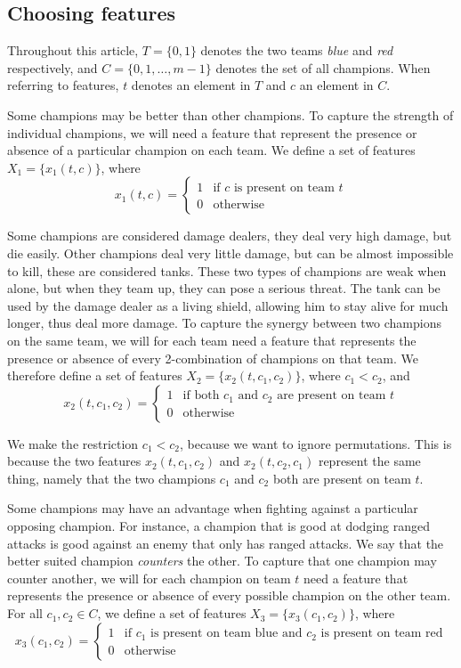 \subsection{Choosing features}\label{sec:choosingfeatures}
Throughout this article, $T = \{0, 1\}$ denotes the two teams \emph{blue} and \emph{red} respectively, and $C = \{0, 1, \dots, m-1\}$ denotes the set of all champions. When referring to features, $t$ denotes an element in $T$ and $c$ an element in $C$.

Some champions may be better than other champions. To capture the strength of individual champions, we will need a feature that represent the presence or absence of a particular champion on each team.
We define a set of features $X_1 = \{x_1(t, c)\}$, where
\[
x_1(t, c) = 
\begin{cases} 
  1 & \text{if } c \text{ is present on team } t \\
  0 & \text{otherwise} 
\end{cases}
\]

Some champions are considered damage dealers, they deal very high damage, but die easily. Other champions deal very little damage, but can be almost impossible to kill, these are considered tanks. These two types of champions are weak when alone, but when they team up, they can pose a serious threat. The tank can be used by the damage dealer as a living shield, allowing him to stay alive for much longer, thus deal more damage.
To capture the synergy between two champions on the same team, we will for each team need a feature that represents the presence or absence of every 2-combination %
of champions on that team. We therefore define a set of features $X_2 = \{x_2(t, c_1, c_2)\}$, where $c_1 < c_2$, and
\[
x_2(t, c_1, c_2) = 
\begin{cases} 
1 & \text{if both } c_1 \text{ and } c_2 \text{ are present on team } t \\
0 & \text{otherwise} 
\end{cases}
\]

We make the restriction $c_1 < c_2$, because we want to ignore permutations. This is because the two features $x_2(t, c_1, c_2)$ and $x_2(t, c_2, c_1)$ represent the same thing, namely that the two champions $c_1$ and $c_2$ both are present on team $t$.

Some champions may have an advantage when fighting against a particular opposing champion.
For instance, a champion that is good at dodging ranged attacks is good against an enemy that only has ranged attacks.
We say that the better suited champion \emph{counters} the other.
To capture that one champion may counter another, we will for each champion on team $t$ need a feature that represents the presence or absence of every possible champion on the other team.
For all $c_1, c_2 \in C$, we define a set of features $X_3= \{x_3(c_1, c_2) \}$, where
\[x_3(c_1, c_2) = 
\begin{cases} 
1 & \text{if } c_1 \text{ is present on team blue and } c_2 \text{ is present on team red} \\ 
0 & \text{otherwise} 
\end{cases}\]

